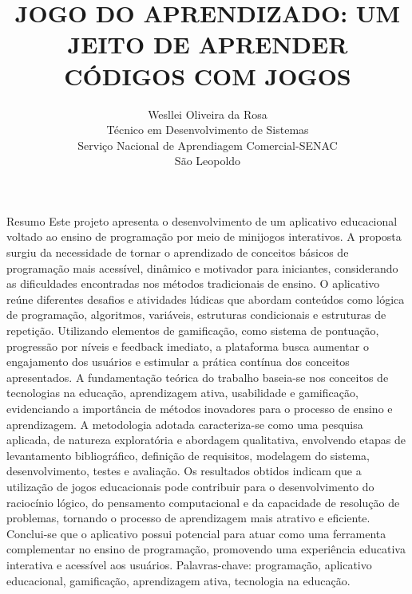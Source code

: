 \documentclass{article}
\title{JOGO DO APRENDIZADO: UM JEITO DE APRENDER CÓDIGOS COM JOGOS}
\author{Wesllei Oliveira da Rosa\\
Técnico em Desenvolvimento de Sistemas\\
Serviço Nacional de Aprendiagem Comercial-SENAC\\
São Leopoldo
}
\begin{document}
\maketitle

\begin{Resumo}
    Resumo
Este projeto apresenta o desenvolvimento de um aplicativo educacional voltado ao ensino de programação por meio de minijogos interativos. A proposta surgiu da necessidade de tornar o aprendizado de conceitos básicos de programação mais acessível, dinâmico e motivador para iniciantes, considerando as dificuldades encontradas nos métodos tradicionais de ensino.
O aplicativo reúne diferentes desafios e atividades lúdicas que abordam conteúdos como lógica de programação, algoritmos, variáveis, estruturas condicionais e estruturas de repetição. Utilizando elementos de gamificação, como sistema de pontuação, progressão por níveis e feedback imediato, a plataforma busca aumentar o engajamento dos usuários e estimular a prática contínua dos conceitos apresentados.
A fundamentação teórica do trabalho baseia-se nos conceitos de tecnologias na educação, aprendizagem ativa, usabilidade e gamificação, evidenciando a importância de métodos inovadores para o processo de ensino e aprendizagem. A metodologia adotada caracteriza-se como uma pesquisa aplicada, de natureza exploratória e abordagem qualitativa, envolvendo etapas de levantamento bibliográfico, definição de requisitos, modelagem do sistema, desenvolvimento, testes e avaliação.
Os resultados obtidos indicam que a utilização de jogos educacionais pode contribuir para o desenvolvimento do raciocínio lógico, do pensamento computacional e da capacidade de resolução de problemas, tornando o processo de aprendizagem mais atrativo e eficiente. Conclui-se que o aplicativo possui potencial para atuar como uma ferramenta complementar no ensino de programação, promovendo uma experiência educativa interativa e acessível aos usuários.
Palavras-chave: programação, aplicativo educacional, gamificação, aprendizagem ativa, tecnologia na educação.
\end{Resumo}
\end{document}
